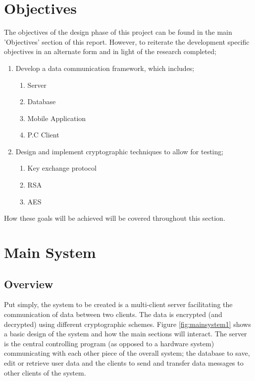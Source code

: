 \documentclass[a4paper,10pt]{report}
\begin{document}
\section{Objectives}

The objectives of the design phase of this project can be found in the main 'Objectives' section of this report. However, to reiterate the development specific objectives in an alternate form and in light of the research completed;

\begin{enumerate}
 \item Develop a data communication framework, which includes;

    \begin{enumerate}
      \item Server
      \item Database
      \item Mobile Application
      \item P.C Client
    \end{enumerate}

  \item Design and implement cryptographic techniques to allow for testing;

    \begin{enumerate}
      \item Key exchange protocol
      \item RSA
      \item AES
    \end{enumerate}

\end{enumerate}

How these goals will be achieved will be covered throughout this section.

\section{Main System}

\subsection{Overview}

Put simply, the system to be created is a multi-client server facilitating the communication of data between two clients. The data is encrypted (and decrypted) using different cryptographic schemes. Figure \ref{fig:mainsystem1} shows a basic design of the system and how the main sections will interact. The server is the central controlling program (as opposed to a hardware system) communicating with each other piece of the overall system; the database to save, edit or retrieve user data and the clients to send and transfer data messages to other clients of the system.
\end{document}
